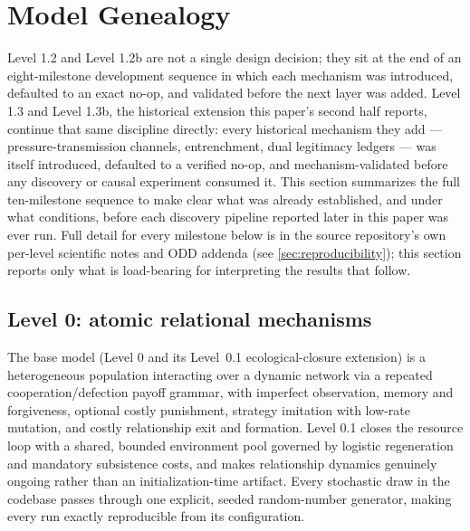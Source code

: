 \section{Model Genealogy}
\label{sec:model-genealogy}

Level 1.2 and Level 1.2b are not a single design decision; they sit at the
end of an eight-milestone development sequence in which each mechanism was
introduced, defaulted to an exact no-op, and validated before the next
layer was added. Level 1.3 and Level 1.3b, the historical extension this
paper's second half reports, continue that same discipline directly:
every historical mechanism they add --- pressure-transmission channels,
entrenchment, dual legitimacy ledgers --- was itself introduced, defaulted
to a verified no-op, and mechanism-validated before any discovery or causal
experiment consumed it. This section summarizes the full ten-milestone
sequence to make clear what was already established, and under what
conditions, before each discovery pipeline reported later in this paper was
ever run. Full detail for every milestone below is in the source
repository's own per-level scientific notes and ODD addenda (see
\cref{sec:reproducibility}); this section reports only what is load-bearing
for interpreting the results that follow.

\begin{table}[htbp]
\centering
\caption{Model layers and mechanisms by milestone. Every mechanism
defaults to a verified, byte-for-byte no-op unless explicitly activated.}
\label{tab:mechanism-layer}
\end{table}

\subsection{Level 0: atomic relational mechanisms}
\label{sec:level0}

The base model (Level 0 and its Level~0.1 ecological-closure extension) is
a heterogeneous population interacting over a dynamic network via a
repeated cooperation/defection payoff grammar, with imperfect observation,
memory and forgiveness, optional costly punishment, strategy imitation
with low-rate mutation, and costly relationship exit and formation. Level
0.1 closes the resource loop with a shared, bounded environment pool
governed by logistic regeneration and mandatory subsistence costs, and
makes relationship dynamics genuinely ongoing rather than an
initialization-time artifact. Every stochastic draw in the codebase passes
through one explicit, seeded random-number generator, making every run
exactly reproducible from its configuration.

